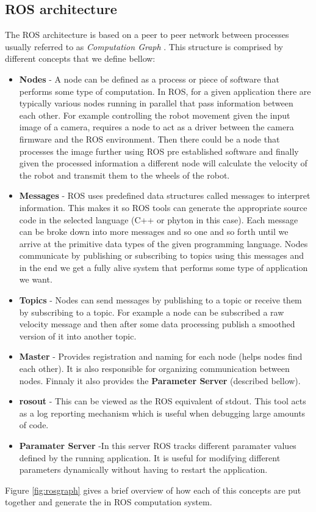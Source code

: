 \subsection{ROS architecture}
The \ac{ROS}  architecture is based on a peer to peer network between processes usually referred to as \textit{Computation Graph} \cite{packt}. This structure is comprised by different concepts that we define bellow:
\begin{itemize}
\item \textbf{Nodes} - A node can be defined as a process or piece of software  that performs some type of computation. In \ac{ROS}, for a given application there are typically various nodes running in parallel that pass information between each other. For example  controlling the robot movement given the input image of a camera,  requires a node to act as a driver between the camera firmware and the ROS environment. Then there could be a node that processes the image further using ROS pre established software and finally given the processed information a different node will calculate the velocity of the robot and transmit them to the wheels of the robot. 
\item \textbf{Messages} - \ac{ROS} uses predefined data structures  called messages to interpret information. This makes it so \ac{ROS} tools can generate the appropriate source code in the selected language (C++ or phyton in this case). Each message can be broke down into more messages and so one and so forth until we arrive at the primitive data types of the given programming language. Nodes communicate by publishing or subscribing  to topics using this messages and in the end we get a fully alive system that performs some type of application we want. 
\item \textbf{Topics} - Nodes can send messages by publishing to a topic or receive them by subscribing to a topic. For example a node can be subscribed a raw velocity message and then after some data processing publish a smoothed version of it into another topic.  
\item \textbf{Master} - Provides registration and naming for each node (helps nodes find each other). It is also responsible for organizing communication between nodes. Finnaly it also provides the \textbf{Parameter Server} (described bellow).
\item \textbf{rosout} - This can be viewed as the ROS equivalent of stdout. This tool acts as a log reporting mechanism which is useful when debugging large amounts of code.
\item \textbf{Paramater Server} -In this server \ac{ROS} tracks different paramater values defined by the running application. It is useful for modifying different parameters dynamically without having to restart the application.
\end{itemize}
Figure \ref{fig:rosgraph} gives a brief overview of how each of this concepts are put together and  generate the in ROS  computation system.

